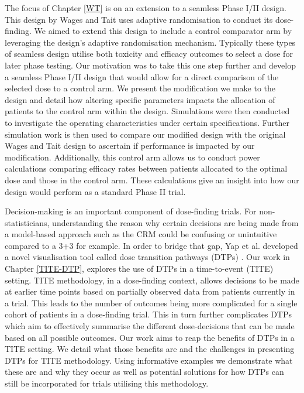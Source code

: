 The focus of Chapter \ref{WT} is on an extension to a seamless Phase \RN{1}/\RN{2} design. This design by Wages and Tait \cite{wagesSeamlessPhaseII2015} uses adaptive randomisation to conduct its dose-finding. We aimed to extend this design to include a control comparator arm by leveraging the design's adaptive randomisation mechanism. Typically these types of seamless design utilise both toxicity and efficacy outcomes to select a dose for later phase testing. Our motivation was to take this one step further and develop a seamless Phase \RN{1}/\RN{2} design that would allow for a direct comparison of the selected dose to a control arm. We present the modification we make to the design and detail how altering specific parameters impacts the allocation of patients to the control arm within the design. Simulations were then conducted to investigate the operating characteristics under certain specifications. Further simulation work is then used to compare our modified design with the original Wages and Tait design to ascertain if performance is impacted by our modification. Additionally, this control arm allows us to conduct power calculations comparing efficacy rates between patients allocated to the optimal dose and those in the control arm. These calculations give an insight into how our design would perform as a standard Phase \RN{2} trial. 

Decision-making is an important component of dose-finding trials. For non-statisticians, understanding the reason why certain decisions are being made from a model-based approach such as the CRM could be confusing or unintuitive compared to a 3+3 for example. In order to bridge that gap, Yap et al. developed a novel visualisation tool called dose transition pathways (DTPs) \cite{yapDoseTransitionPathways2017}. Our work in Chapter \ref{TITE-DTP}, explores the use of DTPs in a time-to-event (TITE) setting. TITE methodology, in a dose-finding context, allows decisions to be made at earlier time points based on partially observed data from patients currently in a trial. This leads to the number of outcomes being more complicated for a single cohort of patients in a dose-finding trial. This in turn further complicates DTPs which aim to effectively summarise the different dose-decisions that can be made based on all possible outcomes. Our work aims to reap the benefits of DTPs in a TITE setting. We detail what those benefits are and the challenges in presenting DTPs for TITE methodology. Using informative examples we demonstrate what these are and why they occur as well as potential solutions for how DTPs can still be incorporated for trials utilising this methodology. 

